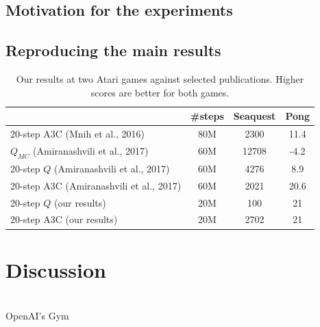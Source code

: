 \documentclass{article}
\begin{document}
\subsection{Motivation for the experiments}
\subsection{Reproducing the main results}


\begin{table}
\centering
\label{table1}
    \begin{tabular}{@{}l|c|cc}
    \toprule
                                             & \#steps     & Seaquest       & Pong            \\ \midrule
    20-step A3C (Mnih et al., 2016)          & 80M         & 2300           & 11.4            \\ \midrule
    $Q_{MC}$ (Amiranashvili et al., 2017)    & 60M         & 12708          & -4.2            \\
    20-step $Q$ (Amiranashvili et al., 2017) & 60M         & 4276           & 8.9             \\
    20-step A3C (Amiranashvili et al., 2017) & 60M         & 2021           & 20.6            \\ \midrule
    20-step $Q$ (our results)                & 20M         & 100            & 21              \\
    20-step A3C (our results)                & 20M         & 2702           & 21              \\ \bottomrule
    \end{tabular}
\caption{Our results at two Atari games against selected publications. Higher scores are better for both games.}
\end{table}

\section{Discussion}


\citet{mnih2015} \\
OpenAI's Gym \citep{gym} \\
\citep{pytorch} \\
\citet{amiranashvili2018analyzing} \\
\citet{pmlr-v48-mniha16}

\pagebreak

\small


\end{document}
